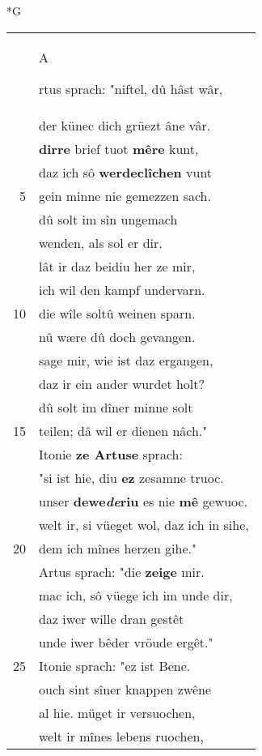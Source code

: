 \documentclass[8pt,a4paper,notitlepage]{article}
\begin{document}
\begin{table}[ht]
\begin{minipage}[t]{0.5\linewidth}
\small
\begin{center}*G
\end{center}
\begin{tabular}{rl}
 & \begin{large}A\end{large}rtus sprach: "niftel, dû hâst wâr,\\ 
 & der künec dich grüezt âne vâr.\\ 
 & \textbf{dirre} brief tuot \textbf{mêre} kunt,\\ 
 & daz ich sô \textbf{werdeclîchen} vunt\\ 
5 & gein minne nie gemezzen sach.\\ 
 & dû solt im sîn ungemach\\ 
 & wenden, als sol er dir.\\ 
 & lât ir daz beidiu her ze mir,\\ 
 & ich wil den kampf undervarn.\\ 
10 & die wîle soltû weinen sparn.\\ 
 & nû wære dû doch gevangen.\\ 
 & sage mir, wie ist daz ergangen,\\ 
 & daz ir ein ander wurdet holt?\\ 
 & dû solt im dîner minne solt\\ 
15 & teilen; dâ wil er dienen nâch."\\ 
 & Itonie \textbf{ze Artuse} sprach:\\ 
 & "si ist hie, diu \textbf{ez} zesamne truoc.\\ 
 & unser \textbf{dewe\textit{de}riu} es nie \textbf{mê} gewuoc.\\ 
 & welt ir, si vüeget wol, daz ich in sihe,\\ 
20 & dem ich mînes herzen gihe."\\ 
 & Artus sprach: "die \textbf{zeige} mir.\\ 
 & mac ich, sô vüege ich im unde dir,\\ 
 & daz iwer wille dran gestêt\\ 
 & unde iwer bêder vröude ergêt."\\ 
25 & Itonie sprach: "ez ist Bene.\\ 
 & ouch sint sîner knappen zwêne\\ 
 & al hie. müget ir versuochen,\\ 
 & welt ir mînes lebens ruochen,\\ 

\end{tabular}
\end{minipage}
\end{table}
\end{document}
